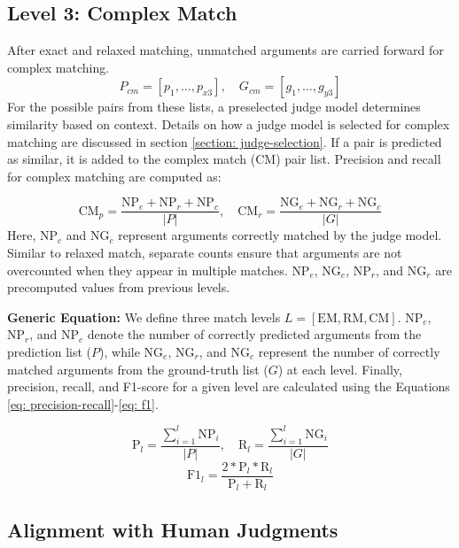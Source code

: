 \subsection{Level 3: Complex Match}
\label{subsection:complex-match}
After exact and relaxed matching, unmatched arguments are carried forward for complex matching. 
\[
P_{cm} = [p_1, \ldots, p_{x3}], \quad
G_{cm} = [g_1, \ldots, g_{y3}] 
\]
For the possible pairs from these lists, a preselected judge model determines similarity based on context. Details on how a judge model is selected for complex matching are discussed in section \ref{section: judge-selection}. If a pair is predicted as similar, it is added to the complex match (CM) pair list. Precision and recall for complex matching are computed as:


{\small
\[
\text{CM}_{p} = \frac{\text{NP}_e + \text{NP}_r + \text{NP}_c}{|P|}, \quad
\text{CM}_{r} = \frac{\text{NG}_e + \text{NG}_r + \text{NG}_c}{|G|}
\]
}
Here, \(\text{NP}_c\) and \(\text{NG}_c\) represent arguments correctly matched by the judge model. Similar to relaxed match, separate counts ensure that arguments are not overcounted when they appear in multiple matches. \(\text{NP}_e\), \(\text{NG}_e\), \(\text{NP}_r\), and \(\text{NG}_r\) are precomputed values from previous levels. 

\textbf{Generic Equation:}
We define three match levels \(L = [\text{EM}, \text{RM}, \text{CM}]\). \(\text{NP}_{e}\), \(\text{NP}_{r}\), and \(\text{NP}_{c}\) denote the number of correctly predicted arguments from the prediction list (\(P\)), while \(\text{NG}_{e}\), \(\text{NG}_{r}\), and \(\text{NG}_{c}\) represent the number of correctly matched arguments from the ground-truth list (\(G\)) at each level. Finally, precision, recall, and F1-score for a given level are calculated using the Equations \ref{eq: precision-recall}-\ref{eq: f1}.

{
\small
\begin{equation}
   \text{P}_l = \frac{\sum_{i=1}^{l} \text{NP}_{i}}{|P|},  \quad
   \text{R}_l = \frac{\sum_{i=1}^{l} \text{NG}_{i}}{|G|}
   \label{eq: precision-recall}
\end{equation}
\begin{equation}
   \text{F1}_l = \frac{2 * \text{P}_l * \text{R}_l}{\text{P}_l + \text{R}_l}
   \label{eq: f1}
\end{equation}
}
\subsection{Alignment with Human Judgments}
\label{subsection:judgement-alignment}


